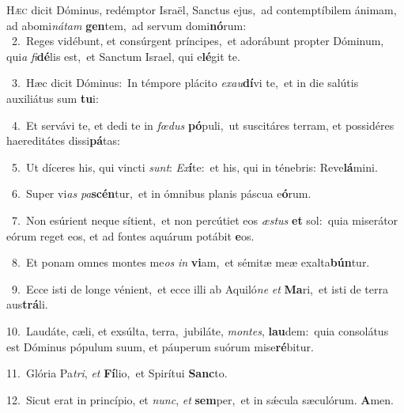 \lettrine{\initial\textcolor{\initialcolor}{H}}{æc} dicit Dóminus, redémptor Israël, Sanctus ejus,~\dagger ad contemptíbilem ánimam, ad abomi\-\textit{ná}\-\textit{tam} \textbf{gen}\-tem,~\star ad servum domi\-\textbf{nó}\-rum:\\
{\numbfont\textcolor{\numbcolor}{~2.}}~Reges vidébunt, et consúrgent príncipes,~\dagger et adorábunt propter Dóminum, qui\textit{a} \textit{fi}\-\textbf{dé}lis est,~\star et Sanctum Israel, qui e\-\textbf{lé}\-git te.\par
{\numbfont\textcolor{\numbcolor}{~3.}}~Hæc dicit Dóminus:~\dagger In témpore plácito \textit{ex}\-\textit{au}\textbf{dí}vi te,~\star et in die salútis auxiliátus sum \textbf{tu}\-i:\par
{\numbfont\textcolor{\numbcolor}{~4.}}~Et servávi te, et dedi te in \textit{fœ}\-\textit{dus} \textbf{pó}\-puli,~\star ut suscitáres terram, et possidéres haereditátes dissi\-\textbf{pá}\-tas:\par
{\numbfont\textcolor{\numbcolor}{~5.}}~Ut díceres his, qui vincti \textit{sunt}\-: \textit{Ex}\-\textbf{í}te:~\star et his, qui in ténebris: Reve\-\textbf{lá}\-mini.\par
{\numbfont\textcolor{\numbcolor}{~6.}}~Super vi\textit{as} \textit{pa}\-\textbf{scén}tur,~\star et in ómnibus planis páscua e\-\textbf{ó}\-rum.\par
{\numbfont\textcolor{\numbcolor}{~7.}}~Non esúrient neque sítient,~\dagger et non percútiet eos \textit{æs}\-\textit{tus} \textbf{et} sol:~\star quia miserátor eórum reget eos, et ad fontes aquárum potábit \textbf{e}\-os.\par
{\numbfont\textcolor{\numbcolor}{~8.}}~Et ponam omnes montes me\textit{os} \textit{in} \textbf{vi}\-am,~\star et sémitæ meæ exalta\-\textbf{bún}\-tur.\par
{\numbfont\textcolor{\numbcolor}{~9.}}~Ecce isti de longe vénient,~\dagger et ecce illi ab Aquiló\textit{ne} \textit{et} \textbf{Ma}\-ri,~\star et isti de terra aus\-\textbf{trá}\-li.\par
{\numbfont\textcolor{\numbcolor}{10.}}~Laudáte, cæli, et exsúlta, terra,~\dagger jubiláte, \textit{mon}\-\textit{tes}, \textbf{lau}\-dem:~\star quia consolátus est Dóminus pópulum suum, et páuperum suórum mise\-\textbf{ré}\-bitur.\par
{\numbfont\textcolor{\numbcolor}{11.}}~Glória Pa\-\textit{tri}\-, \textit{et} \textbf{Fí}\-lio,~\star et Spirítui \textbf{Sanc}\-to.\par
{\numbfont\textcolor{\numbcolor}{12.}}~Sicut erat in princípio, et \textit{nunc}\-, \textit{et} \textbf{sem}\-per,~\star et in sǽcula sæculórum. \textbf{A}\-men.\par
